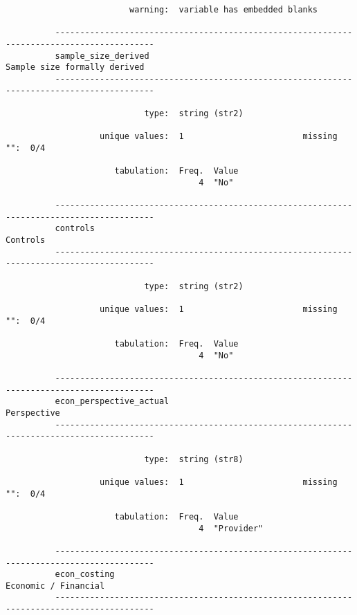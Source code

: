 \documentclass{article}
\begin{document}
\begin{verbatim}
                         warning:  variable has embedded blanks
          
          ------------------------------------------------------------------------------------------
          sample_size_derived                                           Sample size formally derived
          ------------------------------------------------------------------------------------------
          
                            type:  string (str2)
          
                   unique values:  1                        missing "":  0/4
          
                      tabulation:  Freq.  Value
                                       4  "No"
          
          ------------------------------------------------------------------------------------------
          controls                                                                          Controls
          ------------------------------------------------------------------------------------------
          
                            type:  string (str2)
          
                   unique values:  1                        missing "":  0/4
          
                      tabulation:  Freq.  Value
                                       4  "No"
          
          ------------------------------------------------------------------------------------------
          econ_perspective_actual                                                        Perspective
          ------------------------------------------------------------------------------------------
          
                            type:  string (str8)
          
                   unique values:  1                        missing "":  0/4
          
                      tabulation:  Freq.  Value
                                       4  "Provider"
          
          ------------------------------------------------------------------------------------------
          econ_costing                                                          Economic / Financial
          ------------------------------------------------------------------------------------------
          

\end{verbatim}
\end{document}
